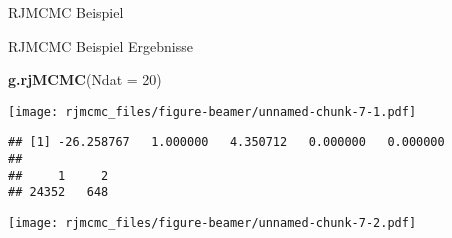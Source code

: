 \documentclass[ignorenonframetext,]{beamer}
\newenvironment{Shaded}{\begin{snugshade}}{\end{snugshade}}
\newcommand{\KeywordTok}[1]{\textcolor[rgb]{0.13,0.29,0.53}{\textbf{{#1}}}}
\newcommand{\DataTypeTok}[1]{\textcolor[rgb]{0.13,0.29,0.53}{{#1}}}
\newcommand{\DecValTok}[1]{\textcolor[rgb]{0.00,0.00,0.81}{{#1}}}
\newcommand{\StringTok}[1]{\textcolor[rgb]{0.31,0.60,0.02}{{#1}}}
\newcommand{\NormalTok}[1]{{#1}}
\begin{document}
\begin{frame}{RJMCMC Beispiel}
\begin{Shaded}
\end{Shaded}

\end{frame}

\begin{frame}[fragile]{RJMCMC Beispiel Ergebnisse}

\begin{Shaded}
\begin{Highlighting}[]
\KeywordTok{g.rjMCMC}\NormalTok{(}\DataTypeTok{Ndat =} \DecValTok{20}\NormalTok{)}
\end{Highlighting}
\end{Shaded}

\texttt{[image: rjmcmc\_files/figure-beamer/unnamed-chunk-7-1.pdf]}

\begin{verbatim}
## [1] -26.258767   1.000000   4.350712   0.000000   0.000000
## 
##     1     2 
## 24352   648
\end{verbatim}

\texttt{[image: rjmcmc\_files/figure-beamer/unnamed-chunk-7-2.pdf]}

\end{frame}
\end{document}
